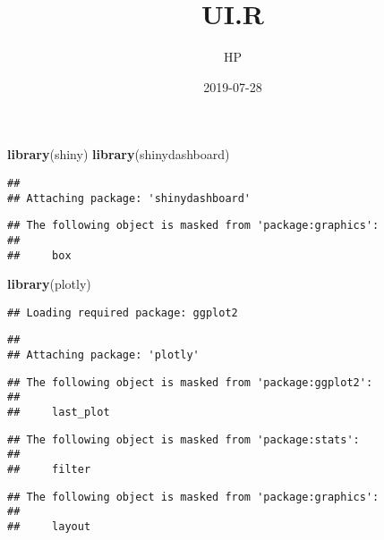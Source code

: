 \documentclass[]{article}
\title{UI.R}
\author{HP}
\date{2019-07-28}
\newenvironment{Shaded}{\begin{snugshade}}{\end{snugshade}}
\newcommand{\KeywordTok}[1]{\textcolor[rgb]{0.13,0.29,0.53}{\textbf{#1}}}
\newcommand{\NormalTok}[1]{#1}
\begin{document}
\maketitle

\begin{Shaded}
\begin{Highlighting}[]
\KeywordTok{library}\NormalTok{(shiny)}
\KeywordTok{library}\NormalTok{(shinydashboard)}
\end{Highlighting}
\end{Shaded}

\begin{verbatim}
## 
## Attaching package: 'shinydashboard'
\end{verbatim}

\begin{verbatim}
## The following object is masked from 'package:graphics':
## 
##     box
\end{verbatim}

\begin{Shaded}
\begin{Highlighting}[]
\KeywordTok{library}\NormalTok{(plotly)}
\end{Highlighting}
\end{Shaded}

\begin{verbatim}
## Loading required package: ggplot2
\end{verbatim}

\begin{verbatim}
## 
## Attaching package: 'plotly'
\end{verbatim}

\begin{verbatim}
## The following object is masked from 'package:ggplot2':
## 
##     last_plot
\end{verbatim}

\begin{verbatim}
## The following object is masked from 'package:stats':
## 
##     filter
\end{verbatim}

\begin{verbatim}
## The following object is masked from 'package:graphics':
## 
##     layout
\end{verbatim}
\end{document}
